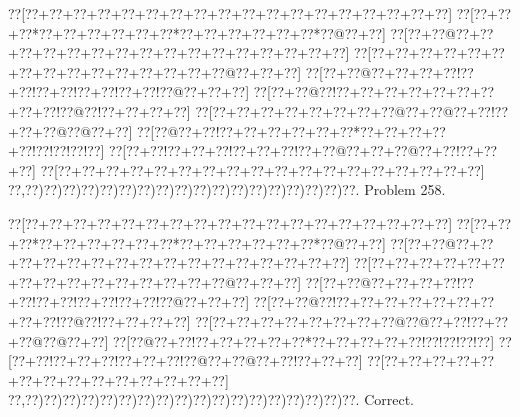 \documentclass[a5paper]{article}
\begin{document}
\newpage
\begin{center}
{\goo
\0??[\0??+\0??+\0??+\0??+\0??+\0??+\0??+\0??+\0??+\0??+\0??+\0??+\0??+\0??+\0??+\0??+\0??+\0??]
\0??[\0??+\0??+\0??*\0??+\0??+\0??+\0??+\0??+\0??*\0??+\0??+\0??+\0??+\0??+\0??*\0??@\0??+\0??]
\0??[\0??+\0??@\0??+\0??+\0??+\0??+\0??+\0??+\0??+\0??+\0??+\0??+\0??+\0??+\0??+\0??+\0??+\0??]
\0??[\0??+\0??+\0??+\0??+\0??+\0??+\0??+\0??+\0??+\0??+\0??+\0??+\0??+\0??+\0??@\0??+\0??+\0??]
\0??[\0??+\0??@\0??+\0??+\0??+\0??!\0??+\0??!\0??+\0??!\0??+\0??!\0??+\0??!\0??@\0??+\0??+\0??]
\0??[\0??+\0??@\0??!\0??+\0??+\0??+\0??+\0??+\0??+\0??+\0??+\0??!\0??@\0??!\0??+\0??+\0??+\0??]
\0??[\0??+\0??+\0??+\0??+\0??+\0??+\0??+\0??@\0??+\0??@\0??+\0??!\0??+\0??+\0??@\0??@\0??+\0??]
\0??[\0??@\0??+\0??!\0??+\0??+\0??+\0??+\0??+\0??*\0??+\0??+\0??+\0??+\0??!\0??!\0??!\0??!\0??]
\0??[\0??+\0??!\0??+\0??+\0??!\0??+\0??+\0??!\0??+\0??@\0??+\0??+\0??@\0??+\0??!\0??+\0??+\0??]
\0??[\0??+\0??+\0??+\0??+\0??+\0??+\0??+\0??+\0??+\0??+\0??+\0??+\0??+\0??+\0??+\0??+\0??+\0??]
\0??,\0??)\0??)\0??)\0??)\0??)\0??)\0??)\0??)\0??)\0??)\0??)\0??)\0??)\0??)\0??)\0??)\0??)\0??.
}
Problem 258.

\end{center}
\begin{center}
{\goo
\0??[\0??+\0??+\0??+\0??+\0??+\0??+\0??+\0??+\0??+\0??+\0??+\0??+\0??+\0??+\0??+\0??+\0??+\0??]
\0??[\0??+\0??+\0??*\0??+\0??+\0??+\0??+\0??+\0??*\0??+\0??+\0??+\0??+\0??+\0??*\0??@\0??+\0??]
\0??[\0??+\0??@\0??+\0??+\0??+\0??+\0??+\0??+\0??+\0??+\0??+\0??+\0??+\0??+\0??+\0??+\0??+\0??]
\0??[\0??+\0??+\0??+\0??+\0??+\0??+\0??+\0??+\0??+\0??+\0??+\0??+\0??+\0??+\0??@\0??+\0??+\0??]
\0??[\0??+\0??@\0??+\0??+\0??+\0??!\0??+\0??!\0??+\0??!\0??+\0??!\0??+\0??!\0??@\0??+\0??+\0??]
\0??[\0??+\0??@\0??!\0??+\0??+\0??+\0??+\0??+\0??+\0??+\0??+\0??!\0??@\0??!\0??+\0??+\0??+\0??]
\0??[\0??+\0??+\0??+\0??+\0??+\0??+\0??+\0??@\0??@\0??+\0??!\0??+\0??+\0??@\0??@\0??+\0??]
\0??[\0??@\0??+\0??!\0??+\0??+\0??+\0??+\0??*\0??+\0??+\0??+\0??+\0??!\0??!\0??!\0??!\0??]
\0??[\0??+\0??!\0??+\0??+\0??!\0??+\0??+\0??!\0??@\0??+\0??@\0??+\0??!\0??+\0??+\0??]
\0??[\0??+\0??+\0??+\0??+\0??+\0??+\0??+\0??+\0??+\0??+\0??+\0??+\0??+\0??]
\0??,\0??)\0??)\0??)\0??)\0??)\0??)\0??)\0??)\0??)\0??)\0??)\0??)\0??)\0??)\0??)\0??)\0??)\0??.
}
Correct. 

\end{center}
\end{document}
